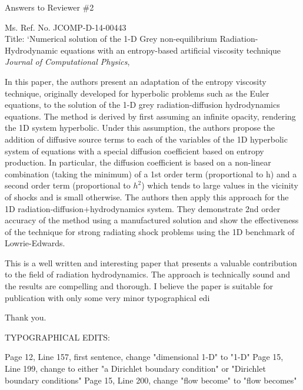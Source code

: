 \documentclass{article}
\begin{document}
\begin{center}
{ \Large Answers to Reviewer \#2}
\end{center}

\bigskip

\noindent Ms. Ref. No. JCOMP-D-14-00443\\
Title: `Numerical solution of the 1-D Grey non-equilibrium Radiation-Hydrodynamic equations with an entropy-based artificial viscosity technique \\
{\it Journal of Computational Physics},\\

\bigskip
\bigskip

{
\color{blue}
In this paper, the authors present an adaptation of the entropy viscosity technique, originally developed for hyperbolic problems such as the Euler equations, to the solution of the 1-D grey radiation-diffusion hydrodynamics equations. The method is derived by first assuming an infinite opacity, rendering  the 1D system hyperbolic. Under this assumption, the authors propose the addition of diffusive source terms to each of the variables of the 1D hyperbolic system of equations with a special diffusion coefficient based on entropy production. In particular, the diffusion coefficient is based on a non-linear combination (taking the minimum) of a 1st order term (proportional to h)  and a second order term (proportional to $h^2$) which tends to large values in the vicinity of shocks and is small otherwise. The authors then apply this approach for the 1D radiation-diffusion+hydrodynamics system. They demonstrate 2nd order accuracy of the method using a manufactured
solution and show the effectiveness of the technique for strong radiating shock problems using the 1D benchmark of Lowrie-Edwards.

This is a well written and interesting paper that presents a valuable contribution to the field of radiation hydrodynamics. The approach is technically sound and the results are compelling and thorough. I believe the paper is suitable for publication with only some very minor typographical edi
}

Thank you. 
\bigskip

{
\color{blue}
\noindent
TYPOGRAPHICAL EDITS:

Page 12, Line 157, first sentence, change "dimensional 1-D" to "1-D"
Page 15, Line 199, change to either "a Dirichlet boundary condition" or  "Dirichlet boundary conditions"
Page 15,  Line 200, change "flow become" to "flow becomes"}
\end{document}
